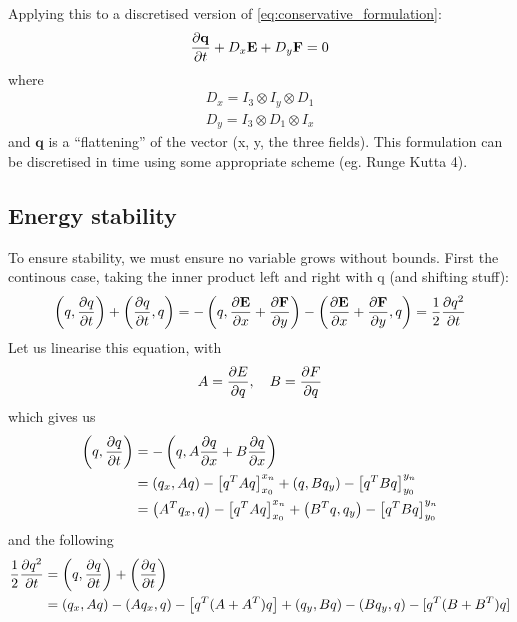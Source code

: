 \documentclass[british]{scrartcl}
\newcommand{\ve}[1]{\mathbf{#1}}
\newcommand{\kron}{\otimes}
\begin{document}
Applying this to a discretised version of \cref{eq:conservative_formulation}:
\begin{gather}
    \pdv{\ve{q}}{t} + D_x \ve{E} + D_y \ve{F} = 0
\end{gather}
where
\begin{gather}
    D_x = I_3 \kron I_y \kron D_1\\
    D_y = I_3 \kron D_1 \kron I_x
\end{gather}
and $\ve{q}$ is a \enquote{flattening} of the vector (x, y, the three fields). This formulation can be discretised in time using some appropriate scheme (eg. Runge Kutta 4).

\subsection{Energy stability}
To ensure stability, we must ensure no variable grows without bounds. First the continous case, taking the inner product left and right with q (and shifting stuff):
\begin{gather}
    \left(q, \pdv{q}{t}\right) + \left(\pdv{q}{t}, q\right)
    = - \left(q, \pdv{\ve{E}}{x} + \pdv{\ve{F}}{y}\right)
      - \left(\pdv{\ve{E}}{x} + \pdv{\ve{F}}{y}, q\right)
    = \frac{1}{2}\pdv{q^2}{t}
\end{gather}
Let us linearise this equation, with
\begin{gather}
    A = \pdv{E}{q}, \hspace{1em} B = \pdv{F}{q}
\end{gather}
which gives us
\begin{align}
    \nonumber \left(q, \pdv{q}{t}\right) &= - \left( q, A \pdv{q}{x} + B \pdv{q}{x} \right) \\
    \nonumber &= {\left(q_x, A q\right)} - {\left[ q^T A q \right]}_{x_0}^{x_n}
     + {\left(q, B q_y \right)} - {\left[ q^T B q \right]}_{y_0}^{y_n} \\
    &= {\left(A^T q_x, q\right)} - {\left[ q^T A q \right]}_{x_0}^{x_n}
     + {\left(B^T q, q_y \right)} - {\left[ q^T B q \right]}_{y_0}^{y_n}
\end{align}
and the following
\begin{align}
    \nonumber \frac{1}{2}\pdv{q^2}{t} &= \left( q, \pdv{q}{t} \right) + \left( \pdv{q}{t} \right) \\
    &= (q_x, Aq) - (Aq_x, q) - \left[q^T (A + A^T) q\right] + (q_y, B q) - (B q_y, q) - [q^T(B + B^T)q]
\end{align}
\end{document}
